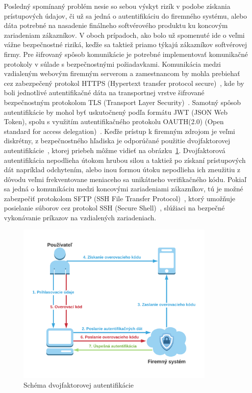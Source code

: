 Posledný spomínaný problém nesie so sebou výskyt rizík v podobe získania prístupových údajov, či už sa jedná o autentifikáciu
do firemného systému, alebo dáta potrebné na nasadenie finálneho softvérového produktu ku koncovým zariadeniam zákazníkov.
V oboch prípadoch, ako bolo už spomenuté ide o veľmi vážne bezpečnostné riziká, keďže sa taktiež priamo týkajú zákazníkov
softvérovej firmy.
Pre šifrovaný spôsob komunikácie je potrebné implementovať komunikačné protokoly v súlade s bezpečnostnými požiadavkami.
Komunikácia medzi vzdialeným webovým firemným serverom a zamestnancom by mohla prebiehať cez zabezpečený protokol
HTTPS (Hypertext transfer protocol secure)~\cite{HTTPS}, kde by boli jednotlivé autentifikačné dáta na transportnej vrstve
šifrované bezpečnostným protokolom TLS (Transport Layer Security)~\cite{TLS}.
Samotný spôsob autentifikácie by mohol byť uskutočnený podľa formátu JWT (JSON Web Token), spolu s využitím autentifikačného
protokolu OAUTH(2.0) (Open standard for access delegation)~\cite{JWT}.
Keďže prístup k firemným zdrojom je veľmi diskrétny, z bezpečnostného hľadiska je odporúčané použitie dvojfaktorovej
autentifikácie~\cite{DvojfaktorovaAutentifikacia}, ktorej priebeh môžme vidieť na obrázku~\ref{fig:obr_6}.
Dvojfaktorová autentifikácia nepodlieha útokom hrubou silou a taktiež po získaní prístupových dát napríklad odchytením,
alebo inou formou útoku nepodlieha ich zneužitiu z dôvodu veľmi frekventovane meniaceho sa unikátneho verifikačného kódu.
Pokiaľ sa jedná o komunikáciu medzi koncovými zariadeniami zákazníkov, tú je možné zabezpečiť protokolom SFTP (SSH File
Transfer Protocol)~\cite{SFTP}, ktorý umožňuje posielanie súborov cez protokol SSH (Secure Shell)~\cite{SSH}, slúžiaci
na bezpečné vykonávanie príkazov na vzdialených zariadeniach.

\begin{figure}[H]
\begin{center}\includegraphics[width=\textwidth,height=8cm,keepaspectratio=true]{assets/2fa_auth.png}\end{center}
\caption[Schéma dvojfaktorovej autentifikácie]{Schéma dvojfaktorovej autentifikácie}\label{fig:obr_6}
\end{figure}

